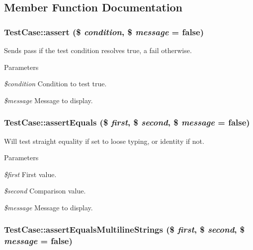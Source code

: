 \subsection{Member Function Documentation}
\hypertarget{class_test_case_a5833f594930beb55e38d29331dc3908f}{
\subsubsection[{assert}]{\setlength{\rightskip}{0pt plus 5cm}TestCase::assert (\$ {\em condition}, \/  \$ {\em message} = {\ttfamily false})}}
\label{class_test_case_a5833f594930beb55e38d29331dc3908f}
Sends pass if the test condition resolves true, a fail otherwise. 
\begin{DoxyParams}{Parameters}
\item[{\em \$condition}]Condition to test true. \item[{\em \$message}]Message to display. \end{DoxyParams}
\hypertarget{class_test_case_a6315b8392b57be03f75453c3dd63e04a}{
\subsubsection[{assertEquals}]{\setlength{\rightskip}{0pt plus 5cm}TestCase::assertEquals (\$ {\em first}, \/  \$ {\em second}, \/  \$ {\em message} = {\ttfamily false})}}
\label{class_test_case_a6315b8392b57be03f75453c3dd63e04a}
Will test straight equality if set to loose typing, or identity if not. 
\begin{DoxyParams}{Parameters}
\item[{\em \$first}]First value. \item[{\em \$second}]Comparison value. \item[{\em \$message}]Message to display. \end{DoxyParams}
\hypertarget{class_test_case_a1069303e24b7cef670a045e017c7465c}{
\subsubsection[{assertEqualsMultilineStrings}]{\setlength{\rightskip}{0pt plus 5cm}TestCase::assertEqualsMultilineStrings (\$ {\em first}, \/  \$ {\em second}, \/  \$ {\em message} = {\ttfamily false})}}
